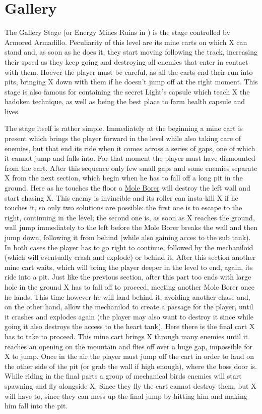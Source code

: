 \chapter{Gallery}
The Gallery Stage (or Energy Mines Ruins in \mhx) is the stage controlled by Armored Armadillo. Peculiarity of this level are its mine carts on which X can stand and, as soon as he does it, they start moving following the track, increasing their speed as they keep going and destroying all enemies that enter in contact with them. Hoever the player must be careful, as all the carts end their run into pits, bringing X down with them if he doesn't jump off at the right moment. This stage is also famous for containing the secret Light's capsule which teach X the hadoken technique, as well as being the best place to farm health capsule and lives.

The stage itself is rather simple. Immediately at the beginning a mine cart is present which brings the player forward in the level while also taking care of enemies, but that end its ride when it comes across a series of gaps, one of which it cannot jump and falls into. For that moment the player must have dismounted from the cart. After this sequence only few small gaps and some enemies separate X from the next section, which begin when he has to fall off a long pit in the ground. Here as he touches the floor a \hyperlink{miniboss:Mole_Borer}{Mole Borer} will destroy the left wall and start chasing X. This enemy is invincible and its roller can insta-kill X if he touches it, so only two solutions are possible: the first one is to escape to the right, continuing in the level; the second one is, as soon as X reaches the ground, wall jump immediately to the left before the Mole Borer breaks the wall and then jump down, following it from behind (while also gaining acces to the sub tank). In both cases the player has to go right to continue, followed by the mechaniloid (which will eventually crash and explode) or behind it. After this section another mine cart waits, which will bring the player deeper in the level to end, again, its ride into a pit. Just like the previous section, after this part too ends with large hole in the ground X has to fall off to proceed, meeting another Mole Borer once he lands. This time however he will land behind it, avoiding another chase and, on the other hand, allow the mechanilod to create a passage for the player, until it crashes and explodes again (the player may also want to destroy it since while going it also destroys the access to the heart tank). Here there is the final cart X has to take to proceed. This mine cart brings X through many enemies until it reaches an opening on the mountain and flies off over a huge gap, impossible for X to jump. Once in the air the player must jump off the cart in order to land on the other side of the pit (or grab the wall if high enough), where the boss door is. While riding in the final parts a group of mechanical birds enemies will start spawning and fly alongside X. Since they fly the cart cannot destroy them, but X will have to, since they can mess up the final jump by hitting him and making him fall into the pit.


